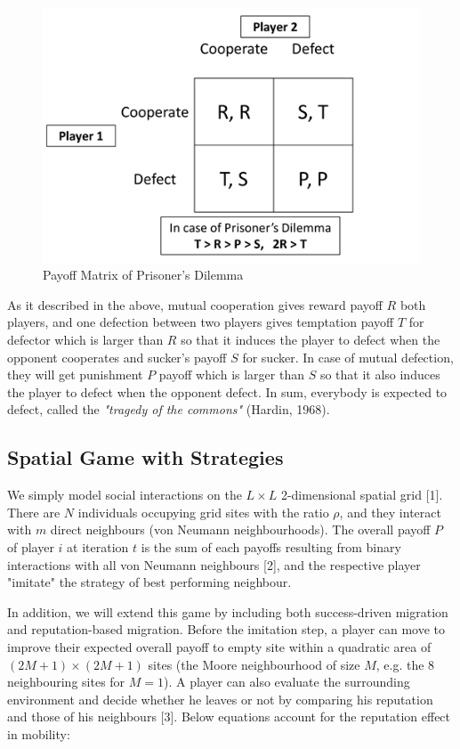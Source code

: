 \documentclass[11pt]{article}
\begin{document}
\begin{figure}[!htbp]
	\centering
	\includegraphics[scale=0.75]{../../other/pd_payoff_matrix.png}
    \caption{Payoff Matrix of Prisoner's Dilemma}
    \label{fig:paymatrix}
\end{figure}

\newpage
As it described in the above, mutual cooperation gives reward payoff $R$ both players, and one defection between two players gives temptation payoff $T$ for defector which is larger than $R$ so that it induces the player to defect when the opponent cooperates and sucker's payoff $S$ for sucker. In case of mutual defection, they will get punishment $P$ payoff which is larger than $S$ so that it also induces the player to defect when the opponent defect. In sum, everybody is expected to defect, called the \textit{"tragedy of the commons"} (Hardin, 1968).


\subsection{Spatial Game with Strategies}

We simply model social interactions on the $L \times L$ 2-dimensional spatial grid [1]. There are $N$ individuals occupying grid sites with the ratio $\rho$, and they interact with $m$ direct neighbours (von Neumann neighbourhoods). The overall payoff $P$ of player $i$ at iteration $t$ is the sum of each payoffs resulting from binary interactions with all von Neumann neighbours [2], and the respective player "imitate" the strategy of best performing neighbour.

In addition, we will extend this game by including both success-driven migration and reputation-based migration. Before the imitation step, a player can move to improve their expected overall payoff to empty site within a quadratic area of $(2M+1) \times (2M+1)$ sites (the Moore neighbourhood of size $M$, e.g. the 8 neighbouring sites for $M = 1$). A player can also evaluate the surrounding environment and decide whether he leaves or not by comparing his reputation and those of his neighbours [3]. Below equations account for the reputation effect in mobility:
\end{document}
